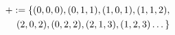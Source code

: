 \documentclass[preview]{standalone}
\begin{document}
\begin{align*}
\special{dvisvgm:raw <g id='unique000'>}+ := \{(0,0,0), (0,1,1), (1,0,1), (1,1,2), \\ (2,0,2), (0,2,2), (2,1,3), (1,2,3) \dots \}\special{dvisvgm:raw </g>}
\end{align*}
\end{document}

